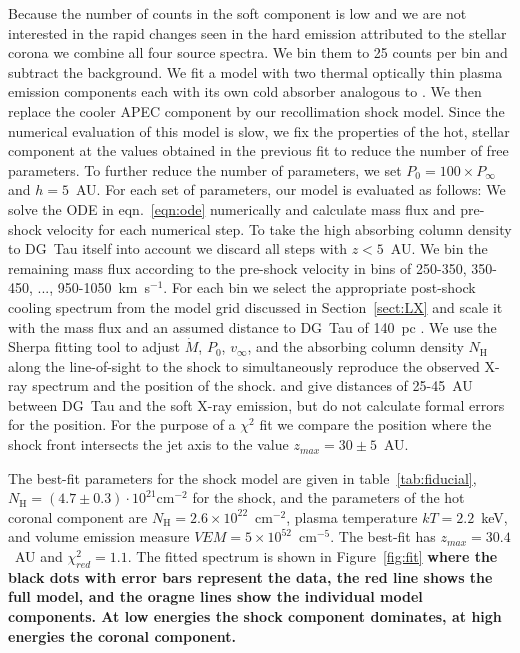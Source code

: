 Because the number of counts in the soft component is low and we are not interested in the rapid changes seen in the hard emission attributed to the stellar corona \citep{2008A&A...478..797G} we combine all four source spectra. We bin them to 25 counts per bin and subtract the background. We fit a model with two thermal optically thin plasma emission components \citep[APEC,][]{2012ApJ...756..128F} each with its own cold absorber analogous to \citet{2008A&A...478..797G}. We then replace the cooler APEC component by our recollimation shock model. Since the numerical evaluation of this model is slow, we fix the properties of the hot, stellar component at the values obtained in the previous fit to reduce the number of free parameters. To further reduce the number of parameters, we set $P_0 = 100\times P_\infty$ and $h=5$~AU. For each set of parameters, our model is evaluated as follows: We solve the ODE in eqn.~\ref{eqn:ode} numerically and calculate mass flux and pre-shock velocity for each numerical step. To take the high absorbing column density to DG~Tau itself into account we discard all steps with $z<5$~AU. We bin the remaining mass flux according to the pre-shock velocity in bins of 250-350, 350-450, ..., 950-1050~km~s$^{-1}$. For each bin we select the appropriate post-shock cooling spectrum from the model grid discussed in Section~\ref{sect:LX} and scale it with the mass flux and an assumed distance to DG~Tau of 140~pc \citep{1994AJ....108.1872K}. We use the Sherpa fitting tool \citep{2001SPIE.4477...76F} to adjust $\dot M$, $P_0$, $v_\infty$, and the absorbing column density $N_\textrm{H}$ along the line-of-sight to the shock to simultaneously reproduce the observed X-ray spectrum and the position of the shock. \citet{2008A&A...488L..13S} and \citet{2011ASPC..448..617G} give distances of 25-45~AU between DG~Tau and the soft X-ray emission, but do not calculate formal errors for the position. For the purpose of a $\chi^2$ fit we compare the position where the shock front intersects the jet axis to the value $z_{max} = 30\pm5$~AU.

The best-fit parameters for the shock model are given in table~\ref{tab:fiducial}, $N_\textrm{H}=(4.7\pm0.3)\cdot10^{21}\mathrm{ cm}^{-2}$ for the shock, and the parameters of the hot coronal component are $N_\textrm{H}=2.6\times10^{22}$~cm$^{-2}$, plasma temperature $kT = 2.2$~keV, and volume emission measure $VEM=5\times10^{52}$~cm$^{-5}$. The best-fit has $z_{max} = 30.4$~AU and $\chi^2_{red}= 1.1$. The fitted spectrum is shown in Figure~\ref{fig:fit} \textbf{where the black dots with error bars represent the data, the red line shows the full model, and the oragne lines show the individual model components. At low energies the shock component dominates, at high energies the coronal component.}